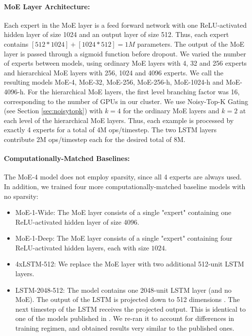 \documentclass{article}
\begin{document}
\paragraph{MoE Layer Architecture:}  Each expert in the MoE layer is a feed forward network with one ReLU-activated hidden layer of size 1024 and an output layer of size 512.  Thus, each expert contains $[512 * 1024] + [1024 * 512] = 1M$ parameters.  The output of the MoE layer is passed through a sigmoid function before dropout.  We varied the number of experts between models, using ordinary MoE layers with 4, 32 and 256 experts and hierarchical MoE layers with 256, 1024 and 4096 experts.   We call the resulting models MoE-4, MoE-32, MoE-256, MoE-256-h, MoE-1024-h and MoE-4096-h.  For the hierarchical MoE layers, the first level branching factor was 16, corresponding to the number of GPUs in our cluster.  We use Noisy-Top-K Gating (see Section \ref{sec:noisytopk}) with $k=4$ for the ordinary MoE layers and $k=2$ at each level of the hierarchical MoE layers.  Thus, each example is processed by exactly 4 experts for a total of 4M ops/timestep.  The two LSTM layers contribute 2M ops/timestep each for the desired total of 8M.

\paragraph{Computationally-Matched Baselines:}

The MoE-4 model does not employ sparsity, since all 4 experts are always used.  In addition, we trained four more computationally-matched baseline models with no sparsity:

\begin{itemize}
  \item MoE-1-Wide: The MoE layer consists of a single "expert" containing one ReLU-activated hidden layer of size 4096.
  \item MoE-1-Deep: The MoE layer consists of a single "expert" containing four ReLU-activated hidden layers, each with size $1024$.
  \item 4xLSTM-512: We replace the MoE layer with two additional 512-unit LSTM layers.
  \item LSTM-2048-512: The model contains one 2048-unit LSTM layer (and no MoE).  The output of the LSTM is projected down to 512 dimensions \citep{sak2014long}.  The next timestep of the LSTM receives the projected output.  This is identical to one of the models published in \citep{RafalNoam16}.  We re-ran it to account for differences in training regimen, and obtained results very similar to the published ones.
\end{itemize}
\end{document}
